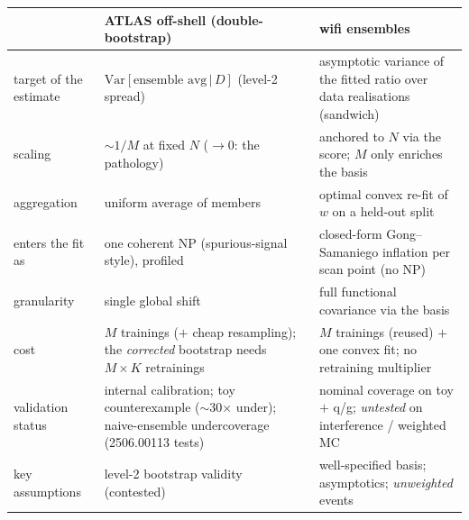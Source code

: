 \documentclass[11pt]{article}
\begin{document}
\begin{table}[h]\centering\small
\begin{tabular}{@{}p{}p{}p{}@{}}
\toprule
 & \textbf{ATLAS off-shell (double-bootstrap)} & \textbf{wifi ensembles}\\
\midrule
target of the estimate & $\mathrm{Var}[\text{ensemble avg}\,|\,D]$ (level-2 spread) & asymptotic variance of the fitted ratio over data realisations (sandwich)\\
scaling & $\sim1/M$ at fixed $N$ ($\to0$: the pathology) & anchored to $N$ via the score; $M$ only enriches the basis\\
aggregation & uniform average of members & optimal convex re-fit of $w$ on a held-out split\\
enters the fit as & one coherent NP (spurious-signal style), profiled & closed-form Gong--Samaniego inflation per scan point (no NP)\\
granularity & single global shift & full functional covariance via the basis\\
cost & $M$ trainings ($+$ cheap resampling); the \emph{corrected} bootstrap needs $M\times K$ retrainings & $M$ trainings (reused) $+$ one convex fit; no retraining multiplier\\
validation status & internal calibration; toy counterexample ($\sim$30$\times$ under); naive-ensemble undercoverage (2506.00113 tests) & nominal coverage on toy $+$ q/g; \emph{untested} on interference / weighted MC\\
key assumptions & level-2 bootstrap validity (contested) & well-specified basis; asymptotics; \emph{unweighted} events\\
\bottomrule
\end{tabular}
\end{table}
\end{document}
